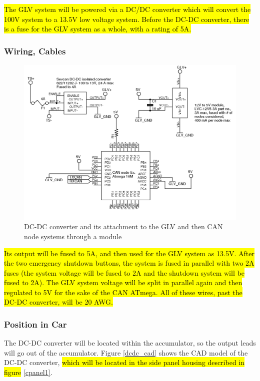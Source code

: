 \documentclass{article}
\DeclareRobustCommand{\hlr}[1]{{\sethlcolor{red}\hl{#1}}}
\begin{document}
            \hlr{The GLV system will be powered via a DC/DC converter which will convert the 100V system to a 13.5V low voltage system. Before the DC-DC converter, there is a fuse for the GLV system as a whole, with a rating of 5A.}

        \subsubsection{Wiring, Cables}

            \begin{figure}[H]
                \centering
                \includegraphics{CANnodepower}
                \caption{DC-DC converter and its attachment to the GLV and then CAN node systems through a module}
                \label{dc-dcglv}
            \end{figure}

            \hlr{Its output will be fused to 5A, and then used for the GLV system as 13.5V. After the two emergency shutdown buttons, the system is fused in parallel with two 2A fuses (the system voltage will be fused to 2A and the shutdown system will be fused to 2A). The GLV system voltage will be split in parallel again and then regulated to 5V for the sake of the CAN ATmega. All of these wires, past the DC-DC converter, will be 20 AWG.}

        \subsubsection{Position in Car}

            The DC-DC converter will be located within the accumulator, so the output leads will go out of the accumulator. Figure \ref{dcdc_cad} shows the CAD model of the DC-DC converter, \hlr{which will be located in the side panel housing described in figure} \ref{cpanel1}.
\end{document}
